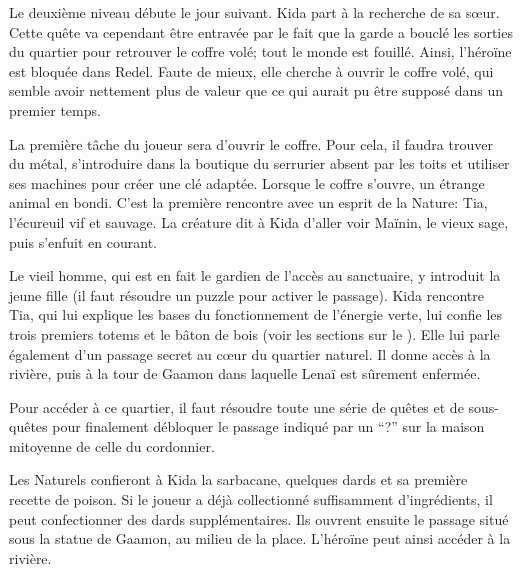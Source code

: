 Le deuxième niveau débute le jour suivant. Kida part à la recherche de sa s\oe ur. Cette quête va cependant être entravée par le fait que la garde a bouclé les sorties du quartier pour retrouver le coffre volé; tout le monde est fouillé. Ainsi, l'héroïne est bloquée dans Redel. Faute de mieux, elle cherche à ouvrir le coffre volé, qui semble avoir nettement plus de valeur que ce qui aurait pu être supposé dans un premier temps.

La première tâche du joueur sera d'ouvrir le coffre. Pour cela, il faudra trouver du métal, s'introduire dans la boutique du serrurier absent par les toits et utiliser ses machines pour créer une clé adaptée. Lorsque le coffre s'ouvre, un étrange animal en bondi. C'est la première rencontre avec un esprit de la Nature: Tia, l'écureuil vif et sauvage. La créature dit à Kida d'aller voir Maïnin, le vieux sage, puis s'enfuit en courant.

Le vieil homme, qui est en fait le gardien de l'accès au sanctuaire, y introduit la jeune fille (il faut résoudre un puzzle pour activer le passage). Kida rencontre Tia, qui lui explique les bases du fonctionnement de l'énergie verte, lui confie les trois premiers totems et le bâton de bois (voir les sections sur le ). Elle lui parle également d'un passage secret au c\oe ur du quartier naturel. Il donne accès à la rivière, puis à la tour de Gaamon dans laquelle Lenaï est sûrement enfermée.

Pour accéder à ce quartier, il faut résoudre toute une série de quêtes et de sous-quêtes pour finalement débloquer le passage indiqué par un \enquote{?} sur la maison mitoyenne de celle du cordonnier.

Les Naturels confieront à Kida la sarbacane, quelques dards et sa première recette de poison. Si le joueur a déjà collectionné suffisamment d'ingrédients, il peut confectionner des dards supplémentaires. Ils ouvrent ensuite le passage situé sous la statue de Gaamon, au milieu de la place. L'héroïne peut ainsi accéder à la rivière.



